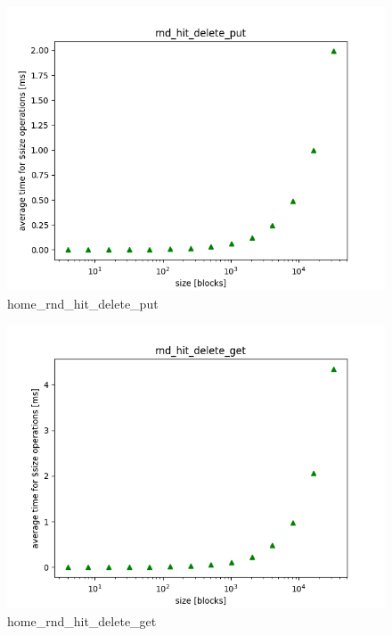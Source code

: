 \documentclass[twocolumn,11pt]{article}
\begin{document}
\begin{figure}[H]
  \includegraphics[width=\linewidth]{Pictures/HOMEPC/rnd_hit_delete_complete_put.png}
  \caption{home\_rnd\_hit\_delete\_put}
  \label{fig:home_rnd_hit_delete_put}
\end{figure}
\begin{figure}[H]
  \includegraphics[width=\linewidth]{Pictures/HOMEPC/rnd_hit_delete_complete_get.png}
  \caption{home\_rnd\_hit\_delete\_get}
  \label{fig:home_rnd_hit_delete_get}
\end{figure}
\end{document}
